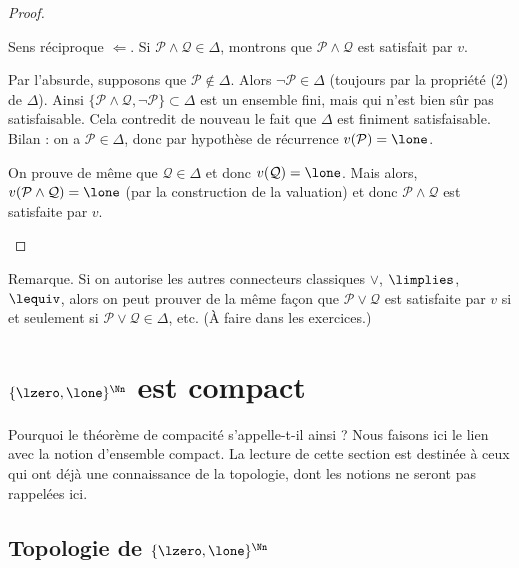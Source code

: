 \documentclass[11pt,class=report,crop=false]{standalone}
\begin{document}
\begin{proof}
\begin{itemize}
	\medskip
	
	Sens réciproque $\Leftarrow$.
	Si $\mathcal{P} \land \mathcal{Q} \in \Delta$, montrons que $\mathcal{P} \land \mathcal{Q}$ est satisfait par $v$.
	 
	Par l'absurde, supposons que $\mathcal{P} \notin \Delta$. Alors $\lnot \mathcal{P} \in \Delta$ (toujours par la propriété (2) de $\Delta$). Ainsi $\{ \mathcal{P} \land \mathcal{Q}, \lnot \mathcal{P} \} \subset \Delta$ est un ensemble fini, mais qui n'est bien sûr pas satisfaisable. Cela contredit de nouveau le fait que $\Delta$ est finiment satisfaisable. 
	Bilan : on a $\mathcal{P} \in \Delta$, donc par hypothèse de récurrence $v(\mathcal{P}) = \lone$.
	
	On prouve de même que $\mathcal{Q} \in \Delta$ et donc $v(\mathcal{Q}) = \lone$. Mais alors, $v( \mathcal{P} \land \mathcal{Q}) = \lone$ (par la construction de la valuation) et donc $\mathcal{P} \land \mathcal{Q}$ est satisfaite par $v$.
		
\end{itemize}

	
\end{proof}

Remarque. Si on autorise les autres connecteurs classiques $\lor$, $\limplies$, $\lequiv$, alors
on peut prouver de la même façon que $\mathcal{P} \lor \mathcal{Q}$ est satisfaite par $v$ si et seulement si $\mathcal{P} \lor \mathcal{Q} \in \Delta$, etc. (À faire dans les exercices.)




\section{$\{\lzero,\lone\}^\Nn$ est compact}

Pourquoi le théorème de compacité s'appelle-t-il ainsi ?
Nous faisons ici le lien avec la notion d'ensemble compact.
La lecture de cette section est destinée à ceux qui ont déjà une connaissance de la topologie, dont les notions ne seront pas rappelées ici.

\subsection{Topologie de $\{\lzero,\lone\}^\Nn$}
\end{document}
